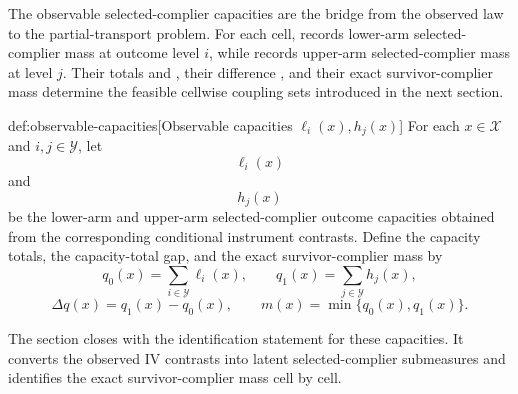 \documentclass[11pt]{article}
\begin{document}
The observable selected-complier capacities are the bridge from the observed law to the partial-transport problem. For each cell,  records lower-arm selected-complier mass at outcome level \(i\), while  records upper-arm selected-complier mass at level \(j\). Their totals  and , their difference , and their exact survivor-complier mass  determine the feasible cellwise coupling sets introduced in the next section.

\begin{definitionv}{def:observable-capacities}[Observable capacities \(\ell_i(x),h_j(x)\)]
For each \(x\in\mathcal X\) and \(i,j\in\mathcal Y\), let
\[
\ell_i(x)
\]
and
\[
h_j(x)
\]
be the lower-arm and upper-arm selected-complier outcome capacities obtained from the corresponding conditional instrument contrasts. Define the capacity totals, the capacity-total gap, and the exact survivor-complier mass by
\[
q_0(x)=\sum_{i\in\mathcal Y}\ell_i(x),
\qquad
q_1(x)=\sum_{j\in\mathcal Y}h_j(x),
\]
\[
\Delta q(x)=q_1(x)-q_0(x),
\qquad
m(x)=\min\{q_0(x),q_1(x)\}.
\]
\end{definitionv}

The section closes with the identification statement for these capacities. It converts the observed IV contrasts into latent selected-complier submeasures and identifies the exact survivor-complier mass cell by cell.
\end{document}
